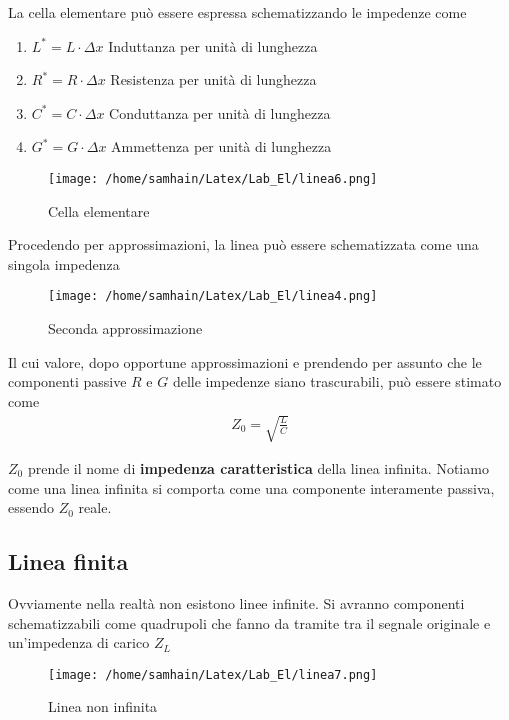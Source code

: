 \documentclass[]{report}
\begin{document}
La cella elementare può essere espressa schematizzando le impedenze come
\begin{enumerate}
	\item $L^* = L \cdot \Delta x$ Induttanza per unità di lunghezza
	\item $R^* = R \cdot \Delta x$ Resistenza per unità di lunghezza
	\item $C^* = C \cdot \Delta x$ Conduttanza per unità di lunghezza
	\item $G^* = G \cdot \Delta x$ Ammettenza per unità di lunghezza
\end{enumerate}

\begin{figure}[!htb]
	\centering
	\texttt{[image: /home/samhain/Latex/Lab\_El/linea6.png]}
	\label{ergwg}
	\caption{\label{luegregegl} \small Cella elementare}
\end{figure}

\newpage
Procedendo per approssimazioni, la linea può essere schematizzata come una singola impedenza
\begin{figure}[!htb]
	\centering
	\texttt{[image: /home/samhain/Latex/Lab\_El/linea4.png]}
	\label{fig:largenenough}
	\caption{\label{kekw} \small Seconda approssimazione}
\end{figure}

Il cui valore, dopo opportune approssimazioni e prendendo per assunto che le componenti passive $R$ e $G$ delle impedenze siano trascurabili, può essere stimato come
\begin{align}
Z_0 = \sqrt{\frac{L}{C}}
\end{align}

$Z_0$ prende il nome di \textbf{impedenza caratteristica} della linea infinita. Notiamo come una linea infinita si comporta come una componente interamente passiva, essendo $Z_0$ reale.


\newpage

\subsection{Linea finita}

Ovviamente nella realtà non esistono linee infinite. Si avranno componenti schematizzabili come quadrupoli che fanno da tramite tra il segnale originale e un'impedenza di carico $Z_L$
\begin{figure}[!htb]
	\centering
	\texttt{[image: /home/samhain/Latex/Lab\_El/linea7.png]}
	\label{ergwg}
	\caption{\label{luegregegl} \small Linea non infinita}
\end{figure}
\end{document}
